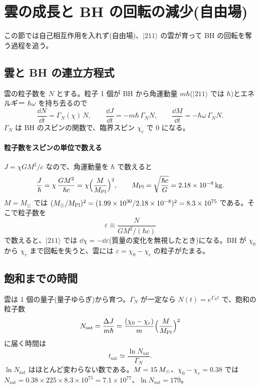 \section{雲の成長と BH の回転の減少(自由場)}\label{sec:cloud}

この節では自己相互作用を入れず(自由場)、$|211\rangle$ の雲が育って BH の回転を奪う過程を追う。

\subsection{雲と BH の連立方程式}

雲の粒子数を $N$ とする。粒子 1 個が BH から角運動量 $m\hbar$($|211\rangle$ では $\hbar$)とエネルギー $\hbar\omega$ を持ち去るので
\begin{equation}
\frac{\dd N}{\dd t}=\Gamma_N(\chi)\,N,\qquad
\frac{\dd J}{\dd t}=-m\hbar\,\Gamma_N N,\qquad
\frac{\dd M}{\dd t}=-\hbar\omega\,\Gamma_N N.
\label{eq:cloud_ode}
\end{equation}
$\Gamma_N$ は BH のスピンの関数で、臨界スピン $\chi_c$ で 0 になる。

\paragraph{粒子数をスピンの単位で数える}
$J=\chi GM^2/c$ なので、角運動量を $\hbar$ で数えると
\begin{equation}
\frac{J}{\hbar}=\chi\,\frac{GM^2}{\hbar c}=\chi\Bigl(\frac{M}{M_\mathrm{Pl}}\Bigr)^2,\qquad
M_\mathrm{Pl}=\sqrt{\frac{\hbar c}{G}}=2.18\times10^{-8}\,\mathrm{kg}.
\end{equation}
$M=M_\odot$ では $(M_\odot/M_\mathrm{Pl})^2=(1.99\times10^{30}/2.18\times10^{-8})^2=8.3\times10^{75}$ である。そこで粒子数を
\begin{equation}
\varepsilon\equiv\frac{N}{GM^2/(\hbar c)}
\label{eq:epsilon}
\end{equation}
で数えると、$|211\rangle$ では $\dd\chi=-\dd\varepsilon$(質量の変化を無視したとき)になる。BH が $\chi_0$ から $\chi_c$ まで回転を失うと、雲には $\varepsilon=\chi_0-\chi_c$ の粒子がたまる。

\subsection{飽和までの時間}

雲は 1 個の量子(量子ゆらぎ)から育つ。$\Gamma_N$ が一定なら $N(t)=e^{\Gamma_Nt}$ で、飽和の粒子数
\begin{equation}
N_\mathrm{sat}=\frac{\Delta J}{m\hbar}=\frac{(\chi_0-\chi_c)}{m}\Bigl(\frac{M}{M_\mathrm{Pl}}\Bigr)^2
\end{equation}
に届く時間は
\begin{equation}
t_\mathrm{sat}\simeq\frac{\ln N_\mathrm{sat}}{\Gamma_N}.
\label{eq:tsat}
\end{equation}
$\ln N_\mathrm{sat}$ はほとんど変わらない数である。$M=15\,M_\odot$、$\chi_0-\chi_c=0.38$ では $N_\mathrm{sat}=0.38\times225\times8.3\times10^{75}=7.1\times10^{77}$、$\ln N_\mathrm{sat}=179$。


